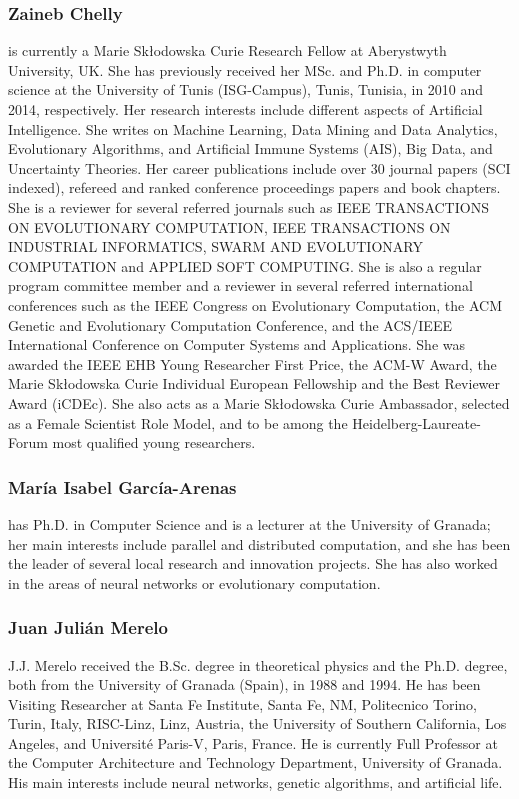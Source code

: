 \documentclass{article}
\begin{document}
\subsubsection* {Zaineb Chelly} is currently a Marie Sk\l{}odowska Curie Research Fellow at Aberystwyth University, UK. She has previously received her MSc. and Ph.D. in computer science at the University of Tunis (ISG-Campus), Tunis, Tunisia, in 2010 and 2014, respectively. Her research interests include different aspects of Artificial Intelligence. She writes on Machine Learning, Data Mining and Data Analytics, Evolutionary Algorithms, and Artificial Immune Systems (AIS), Big Data, and Uncertainty Theories. Her career publications include over 30 journal papers (SCI indexed), refereed and ranked conference proceedings papers and book chapters. She is a reviewer for several referred journals such as IEEE TRANSACTIONS ON EVOLUTIONARY COMPUTATION, IEEE TRANSACTIONS ON INDUSTRIAL INFORMATICS, SWARM AND EVOLUTIONARY COMPUTATION and APPLIED SOFT COMPUTING. She is also a regular program committee member and a reviewer in several referred international conferences such as the IEEE Congress on Evolutionary Computation, the ACM Genetic and Evolutionary Computation Conference, and the ACS/IEEE International Conference on Computer Systems and Applications. She was awarded the IEEE EHB Young Researcher First Price, the ACM-W Award, the Marie Sk\l{}odowska Curie Individual European Fellowship and the Best Reviewer Award (iCDEc). She also acts as a Marie Sk\l{}odowska Curie Ambassador, selected as a Female Scientist Role Model, and to be among the Heidelberg-Laureate-Forum most qualified young researchers.

\subsubsection*{Mar\'ia Isabel Garc\'ia-Arenas} has Ph.D. in Computer Science and is a
lecturer at the University of Granada; her main interests
include parallel and distributed computation, and she has
been the leader of several local research and innovation
projects. She has also worked in the areas of neural
networks or evolutionary computation.

\subsubsection*{Juan Juli\'an Merelo} J.J. Merelo received the B.Sc. degree in theoretical
physics and the Ph.D. degree, both from the University
of Granada (Spain), in 1988 and 1994. He has been
Visiting Researcher at Santa Fe Institute, Santa Fe, NM,
Politecnico Torino, Turin, Italy, RISC-Linz, Linz, Austria,
the University of Southern California, Los Angeles, and
Université Paris-V, Paris, France. He is currently Full
Professor at the Computer Architecture and Technology
Department, University of Granada. His main interests
include neural networks, genetic algorithms, and artificial
life.
\end{document}
